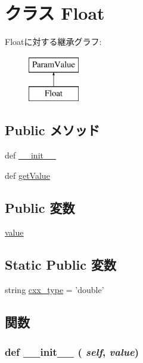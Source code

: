 \hypertarget{classm5_1_1params_1_1Float}{
\section{クラス Float}
\label{classm5_1_1params_1_1Float}
}
Floatに対する継承グラフ:\begin{figure}[H]
\begin{center}
\leavevmode
\includegraphics[height=2cm]{classm5_1_1params_1_1Float}
\end{center}
\end{figure}
\subsection*{Public メソッド}
\begin{DoxyCompactItemize}
\item 
def \hyperlink{classm5_1_1params_1_1Float_ac775ee34451fdfa742b318538164070e}{\_\-\_\-init\_\-\_\-}
\item 
def \hyperlink{classm5_1_1params_1_1Float_acc340fbd4335fa34f9d57fb454b28ed0}{getValue}
\end{DoxyCompactItemize}
\subsection*{Public 変数}
\begin{DoxyCompactItemize}
\item 
\hyperlink{classm5_1_1params_1_1Float_afcc7a4b78ecd8fa7e713f8cfa0f51017}{value}
\end{DoxyCompactItemize}
\subsection*{Static Public 変数}
\begin{DoxyCompactItemize}
\item 
string \hyperlink{classm5_1_1params_1_1Float_a2f1553ebb79374a68b36fdd6d8d82fc3}{cxx\_\-type} = 'double'
\end{DoxyCompactItemize}


\subsection{関数}
\hypertarget{classm5_1_1params_1_1Float_ac775ee34451fdfa742b318538164070e}{
\subsubsection[{\_\-\_\-init\_\-\_\-}]{\setlength{\rightskip}{0pt plus 5cm}def \_\-\_\-init\_\-\_\- ( {\em self}, \/   {\em value})}}
\label{classm5_1_1params_1_1Float_ac775ee34451fdfa742b318538164070e}



